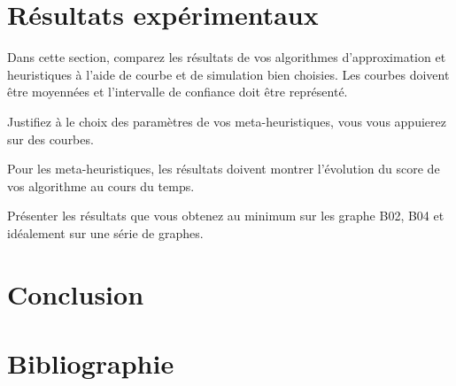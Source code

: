 \documentclass{article}
\begin{document}
\section{Résultats expérimentaux}

Dans cette section, comparez les résultats de vos algorithmes d'approximation et heuristiques à l'aide de courbe et de simulation bien choisies. Les courbes doivent être moyennées et l'intervalle de confiance doit être représenté.

Justifiez à le choix des paramètres de vos meta-heuristiques, vous vous appuierez sur des courbes. 

Pour les meta-heuristiques, les résultats doivent montrer l'évolution du score de vos algorithme au cours du temps.

Présenter les résultats que vous obtenez au minimum sur les graphe B02, B04 et idéalement sur une série de graphes. 


\section{Conclusion}

\section{Bibliographie}
\end{document}
